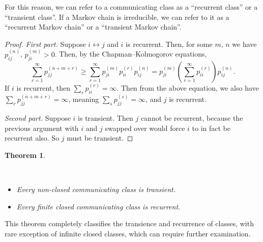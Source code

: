 \documentclass[
  a4paper,
]{article}
\providecommand{\tightlist}{%
  \setlength{\itemsep}{0pt}\setlength{\parskip}{0pt}}
\newtheorem{theorem}{Theorem}[section]
\theoremstyle{definition}
\theoremstyle{definition}
\theoremstyle{definition}
\theoremstyle{remark}
\begin{document}
For this reason, we can refer to a communicating class as a ``recurrent class'' or a ``transient class''. If a Markov chain is irreducible, we can refer to it as a ``recurrent Markov chain'' or a ``transient Markov chain''.

\begin{proof}

\emph{First part.} Suppose \(i \leftrightarrow j\) and \(i\) is recurrent. Then, for some \(m\), \(n\) we have \(p_{ij}^{(n)}\), \(p_{ji}^{(m)} > 0\). Then, by the Chapman--Kolmogorov equations,
\[ \sum_{r=1}^\infty p_{jj}^{(n+m+r)} \geq \sum_{r=1}^\infty p_{ji}^{(m)}p_{ii}^{(r)} p_{ij}^{(n)} = p_{ji}^{(m)} \left(\sum_{r=1}^\infty p_{ii}^{(r)} \right) p_{ij}^{(n)} .   \]
If \(i\) is recurrent, then \(\sum_r p_{ii}^{(r)} = \infty\). Then from the above equation, we also have \(\sum_r p_{jj}^{(n+m+r)} = \infty\), meaning \(\sum_s p_{jj}^{(s)} = \infty\), and \(j\) is recurrent.

\emph{Second part.} Suppose \(i\) is transient. Then \(j\) cannot be recurrent, because the previous argument with \(i\) and \(j\) swapped over would force \(i\) to in fact be recurrent also. So \(j\) must be transient.

\end{proof}

\begin{theorem}
\protect\hypertarget{thm:unlabeled-div-7}{}\label{thm:unlabeled-div-7}

~

\begin{itemize}
\tightlist
\item
  Every non-closed communicating class is transient.
\item
  Every finite closed communicating class is recurrent.
\end{itemize}

\end{theorem}

This theorem completely classifies the transience and recurrence of classes, with rare exception of infinite closed classes, which can require further examination.
\end{document}
